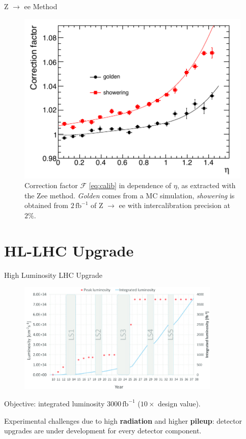 \documentclass[10pt]{beamer}
\begin{document}
\begin{frame}{Z $\rightarrow$ ee Method}
    \begin{figure}
        \centering
        \includegraphics[width=.75\textwidth]{./img/Zee_corr_factor.png}
        \caption{Correction factor $\mathcal{F}$ \eqref{eq:calib} in dependence of $ \eta$, as extracted with the Zee method. \emph{Golden} comes from a MC simulation, \emph{showering} is obtained from $2\,\text{fb}^{-1}$ of Z $\rightarrow$ ee with intercalibration precision at $2\%$.}
        \label{fig:Zee_correction_factor}
    \end{figure}
\end{frame}

\section{HL-LHC Upgrade}

\begin{frame}{High Luminosity LHC Upgrade}
    \begin{figure}
        \centering
        \includegraphics[height=150pt]{img/upgrade/luminosity.png}
    \end{figure}{}
    Objective: integrated luminosity $3000\,\text{fb}^{-1}$ ($10\times$ design value).
    
    Experimental challenges due to high \textbf{radiation} and higher \textbf{pileup}: detector upgrades are under development for every detector component.
\end{frame}
\end{document}
